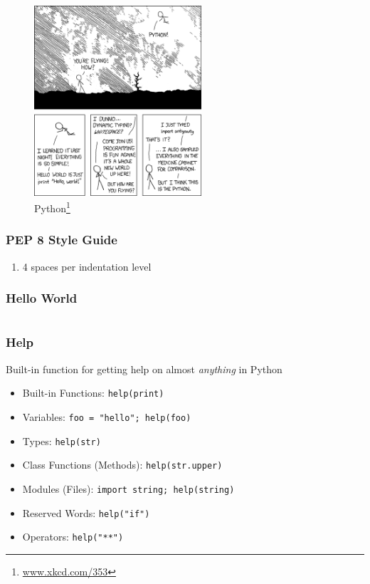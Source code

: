 \documentclass{beamer}
\begin{document}
\begin{frame}
\begin{figure}
  \begin{center}
    \includegraphics[height=200pt,keepaspectratio]{xkcd_python.png}
    \caption
    {
      Python\footnote{\url{www.xkcd.com/353}} 
    }
    \end{center}
  \end{figure}
\end{frame}
 

\begin{frame}
  \frametitle{PEP 8 Style Guide}
  \begin{enumerate}
    \item 4 spaces per indentation level
  \end{enumerate}
\end{frame}


\begin{frame}
  \frametitle{Hello World}
  \inputminted{python}{hello.py}
\end{frame}


\begin{frame}
  \frametitle{Help}
  Built-in function for getting help on almost \textit{anything} in Python
  \begin{itemize}
    \item Built-in Functions: \lstinline{help(print)}
    \item Variables: \lstinline{foo = "hello"; help(foo)}
    \item Types: \lstinline{help(str)}
    \item Class Functions (Methods): \lstinline{help(str.upper)}
    \item Modules (Files): \lstinline{import string; help(string)}
    \item Reserved Words: \lstinline{help("if")}
    \item Operators: \lstinline{help("**")}
  \end{itemize}
\end{frame}
\end{document}
